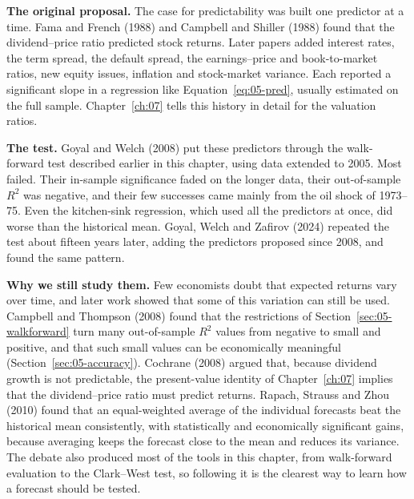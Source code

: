 \textbf{The original proposal.} The case for predictability was built one predictor at a time. Fama and French (1988) and Campbell and Shiller (1988) found that the dividend--price ratio predicted stock returns. Later papers added interest rates, the term spread, the default spread, the earnings--price and book-to-market ratios, new equity issues, inflation and stock-market variance. Each reported a significant slope in a regression like Equation~\eqref{eq:05-pred}, usually estimated on the full sample. Chapter~\ref{ch:07} tells this history in detail for the valuation ratios.

\textbf{The test.} Goyal and Welch (2008) put these predictors through the walk-forward test described earlier in this chapter, using data extended to 2005. Most failed. Their in-sample significance faded on the longer data, their out-of-sample $R^2$ was negative, and their few successes came mainly from the oil shock of 1973--75. Even the kitchen-sink regression, which used all the predictors at once, did worse than the historical mean. Goyal, Welch and Zafirov (2024) repeated the test about fifteen years later, adding the predictors proposed since 2008, and found the same pattern.

\textbf{Why we still study them.} Few economists doubt that expected returns vary over time, and later work showed that some of this variation can still be used. Campbell and Thompson (2008) found that the restrictions of Section~\ref{sec:05-walkforward} turn many out-of-sample $R^2$ values from negative to small and positive, and that such small values can be economically meaningful (Section~\ref{sec:05-accuracy}). Cochrane (2008) argued that, because dividend growth is not predictable, the present-value identity of Chapter~\ref{ch:07} implies that the dividend--price ratio must predict returns. Rapach, Strauss and Zhou (2010) found that an equal-weighted average of the individual forecasts beat the historical mean consistently, with statistically and economically significant gains, because averaging keeps the forecast close to the mean and reduces its variance. The debate also produced most of the tools in this chapter, from walk-forward evaluation to the Clark--West test, so following it is the clearest way to learn how a forecast should be tested.

